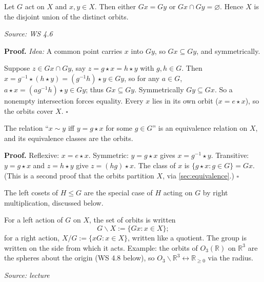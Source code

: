 \documentclass[11pt]{report}
\renewenvironment{proof}[1][Proof]{\noindent\textbf{#1.} }{\hfill$\square$\par\vspace{5pt}}
\newcommand{\srcline}[1]{\par\hfill{\footnotesize\textit{Source: #1}}}
\begin{document}
\begin{propbox}\label{prop:orbits-partition-x}
Let $G$ act on $X$ and $x, y \in X$. Then either $Gx = Gy$ or $Gx \cap Gy = \varnothing$. Hence $X$ is the disjoint union of the distinct orbits.
\srcline{WS 4.6}
\end{propbox}

\begin{proof}
\textit{Idea:} A common point carries $x$ into $Gy$, so $Gx \subseteq Gy$, and symmetrically.\par
Suppose $z \in Gx \cap Gy$, say $z = g \star x = h \star y$ with $g, h \in G$. Then $x = g^{-1} \star (h \star y) = (g^{-1}h) \star y \in Gy$, so for any $a \in G$, $a \star x = (ag^{-1}h) \star y \in Gy$; thus $Gx \subseteq Gy$. Symmetrically $Gy \subseteq Gx$. So a nonempty intersection forces equality. Every $x$ lies in its own orbit ($x = e \star x$), so the orbits cover $X$.
\end{proof}

\begin{propbox}\label{prop:orbit-relation}
The relation ``$x \sim y$ iff $y = g \star x$ for some $g \in G$'' is an equivalence relation on $X$, and its equivalence classes are the orbits.
\end{propbox}

\begin{proof}
Reflexive: $x = e \star x$. Symmetric: $y = g \star x$ gives $x = g^{-1} \star y$. Transitive: $y = g \star x$ and $z = h \star y$ give $z = (hg) \star x$. The class of $x$ is $\{g \star x : g \in G\} = Gx$. (This is a second proof that the orbits partition $X$, via \ref{sec:equivalence}.)
\end{proof}

The left cosets of $H \leq G$ are the special case of $H$ acting on $G$ by right multiplication, discussed below.

\begin{defbox}\label{def:orbit-space-notation}
For a left action of $G$ on $X$, the set of orbits is written
\[ G \backslash X := \{ Gx : x \in X \}; \]
for a right action, $X / G := \{ xG : x \in X \}$, written like a quotient. The group is written on the side from which it acts. Example: the orbits of $O_3(\mathbb{R})$ on $\mathbb{R}^3$ are the spheres about the origin (WS 4.8 below), so $O_3 \backslash \mathbb{R}^3 \leftrightarrow \mathbb{R}_{\geq 0}$ via the radius.
\srcline{lecture}
\end{defbox}
\end{document}
